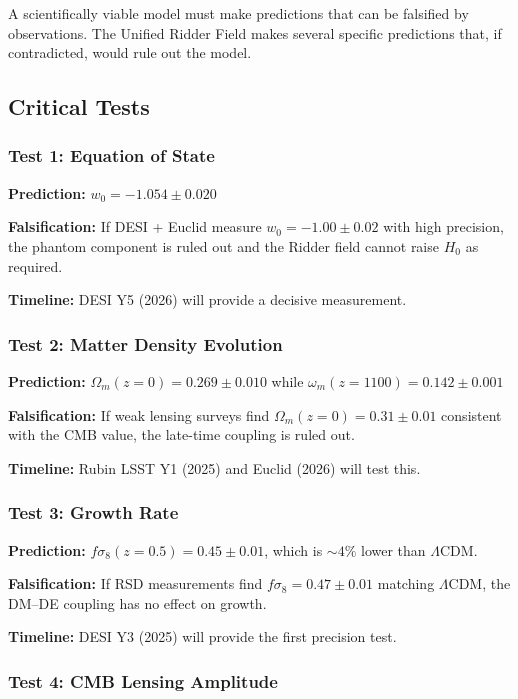 \documentclass[twocolumn,showpacs,preprintnumbers,amsmath,amssymb,prd]{revtex4-2}
\begin{document}
A scientifically viable model must make predictions that can be falsified by observations. The Unified Ridder Field makes several specific predictions that, if contradicted, would rule out the model.

\subsection{Critical Tests}

\subsubsection{Test 1: Equation of State}

\textbf{Prediction:} $w_0 = -1.054 \pm 0.020$

\textbf{Falsification:} If DESI + Euclid measure $w_0 = -1.00 \pm 0.02$ with high precision, the phantom component is ruled out and the Ridder field cannot raise $H_0$ as required.

\textbf{Timeline:} DESI Y5 (2026) will provide a decisive measurement.

\subsubsection{Test 2: Matter Density Evolution}

\textbf{Prediction:} $\Omega_m(z=0) = 0.269 \pm 0.010$ while $\omega_m(z=1100) = 0.142 \pm 0.001$

\textbf{Falsification:} If weak lensing surveys find $\Omega_m(z=0) = 0.31 \pm 0.01$ consistent with the CMB value, the late-time coupling is ruled out.

\textbf{Timeline:} Rubin LSST Y1 (2025) and Euclid (2026) will test this.

\subsubsection{Test 3: Growth Rate}

\textbf{Prediction:} $f\sigma_8(z=0.5) = 0.45 \pm 0.01$, which is $\sim 4\%$ lower than $\Lambda$CDM.

\textbf{Falsification:} If RSD measurements find $f\sigma_8 = 0.47 \pm 0.01$ matching $\Lambda$CDM, the DM--DE coupling has no effect on growth.

\textbf{Timeline:} DESI Y3 (2025) will provide the first precision test.

\subsubsection{Test 4: CMB Lensing Amplitude}
\end{document}
